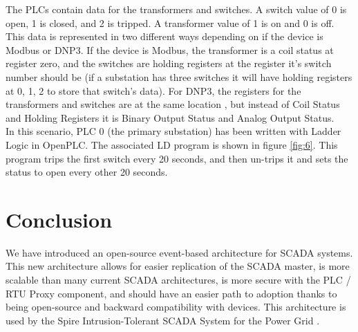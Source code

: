 \documentclass[oneside,11pt,a4paper,oldfontcommands]{book}
\begin{document}
\indent
The PLCs contain data for the transformers and switches. A switch value of 0 is open,
1 is closed, and 2 is tripped. A transformer value of 1 is on and 0 is off.
This data is represented in
two different ways depending on if the device is Modbus or DNP3. If the device is 
Modbus, the transformer is a coil status at register zero, and the switches are 
holding registers at the register it's switch number should be (if a substation
has three switches it will have holding registers at 0, 1, 2 to store that switch's 
data). For DNP3, the registers for the transformers and switches are at the same location
, but instead of Coil Status and Holding Registers it is Binary Output Status
and Analog Output Status. \\

\indent
In this scenario, PLC 0 (the primary substation) has been written with Ladder Logic
in OpenPLC. The associated LD program is shown in figure \ref{fig:6}. This program
trips the first switch every 20 seconds, and then un-trips it and sets the status
to open every other 20 seconds. \\

\chapter{Conclusion}

\indent \indent
We have introduced an open-source event-based architecture for SCADA systems.
This new architecture allows for easier replication of the SCADA master, is more
scalable than many current SCADA architectures, is more secure with
the PLC / RTU Proxy component, and should have an easier path to adoption thanks
to being open-source and backward compatibility with devices. 
This architecture is used by the Spire Intrusion-Tolerant SCADA System for the Power Grid \cite{Spire}.\\

\appendix




\end{document}

